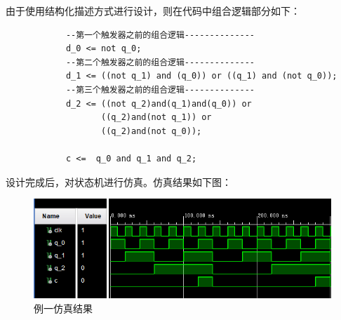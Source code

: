 \documentclass[a4paper]{article}
\begin{document}
		由于使用结构化描述方式进行设计，则在代码中组合逻辑部分如下：
		\begin{lstlisting}
			--第一个触发器之前的组合逻辑--------------
			d_0 <= not q_0;
			--第二个触发器之前的组合逻辑--------------
			d_1 <= ((not q_1) and (q_0)) or ((q_1) and (not q_0));
			--第三个触发器之前的组合逻辑--------------
			d_2 <= ((not q_2)and(q_1)and(q_0)) or
			       ((q_2)and(not q_1)) or
			       ((q_2)and(not q_0));
			
			c <=  q_0 and q_1 and q_2;
		\end{lstlisting}
		设计完成后，对状态机进行仿真。仿真结果如下图：
		\begin{figure}[htbp]
			\centering
			\includegraphics[scale=1]{例一仿真结果.png}
			\caption{例一仿真结果}
		\end{figure}
	
\end{document}
